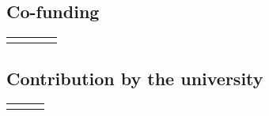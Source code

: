 
\subsection{Co-funding}\label{sec:cofund}

\begin{tabular}[c]{|o{3.6cm}|p{4.1cm}|o{2.4cm}|o{4.1cm}|}
    \hline
    &\centering{}&&\\
    \hline
     & & & \\
    \hline
\end{tabular}


\subsection{Contribution by the university}\label{sec:uni}

\begin{tabular}[c]{|o{3.6cm}|o{6.5cm}|o{4.6cm}|}
    \hline
    &&\\
    \hline
     & &\\
    \hline
\end{tabular}


